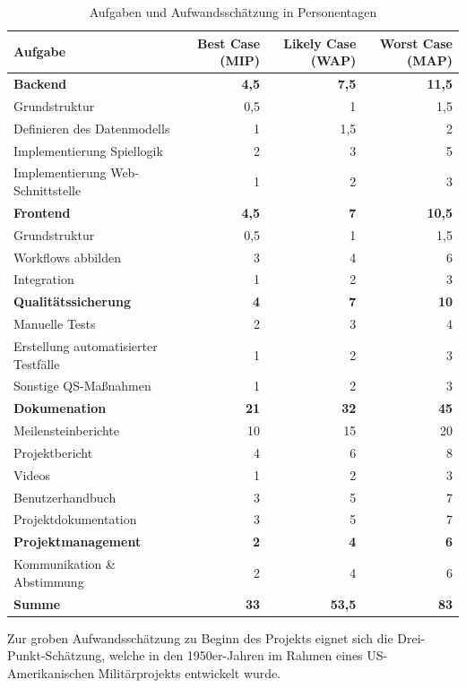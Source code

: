 \documentclass[a4paper,11pt,listof=numbered,glossary=totoc,parskip=half,toc=bib]{scrreprt}
\begin{document}
{	\begin{table}
		\centering
		\begin{tabular}{lrrr}
			\toprule
			Aufgabe & Best Case (MIP) & Likely Case (WAP) & Worst Case (MAP) \\
			\midrule
			\textbf{Backend} & \textbf{4,5} & \textbf{7,5} & \textbf{11,5} \\
			Grundstruktur & 0,5 & 1 & 1,5 \\
			Definieren des Datenmodells & 1 & 1,5 & 2 \\
			Implementierung Spiellogik & 2 & 3 & 5 \\
			Implementierung Web-Schnittstelle & 1 & 2 & 3 \\
			\midrule
			\textbf{Frontend} & \textbf{4,5} & \textbf{7} & \textbf{10,5} \\
			Grundstruktur & 0,5 & 1 & 1,5 \\
			Workflows abbilden & 3 & 4 & 6 \\
			Integration & 1 & 2 & 3 \\
			\midrule
			\textbf{Qualitätssicherung} & \textbf{4} & \textbf{7} & \textbf{10} \\
			Manuelle Tests & 2 & 3 & 4 \\
			Erstellung automatisierter Testfälle & 1 & 2 & 3 \\
			Sonstige QS-Maßnahmen & 1 & 2 & 3 \\
			\midrule 
			\textbf{Dokumenation} & \textbf{21} & \textbf{32} & \textbf{45} \\
			Meilensteinberichte & 10 & 15 & 20 \\
			Projektbericht & 4 & 6 & 8 \\
			Videos & 1 & 2 & 3 \\
			Benutzerhandbuch & 3 & 5 & 7 \\
			Projektdokumentation & 3 & 5 & 7 \\
			\midrule
			\textbf{Projektmanagement} & \textbf{2} & \textbf{4} & \textbf{6} \\
			Kommunikation \& Abstimmung & 2 & 4 & 6 \\
			\midrule 
			\Large\bfseries Summe & \Large\bfseries 33 & \Large\bfseries 53,5 & \Large\bfseries 83 \\
			\bottomrule	
				
		\end{tabular}
		\caption{Aufgaben und Aufwandsschätzung in Personentagen}
		\label{tab:aufwand}
	\end{table}
	
	Zur groben Aufwandsschätzung zu Beginn des Projekts eignet sich die Drei-Punkt-Schätzung, welche in den 1950er-Jahren im Rahmen eines US-Amerikanischen Militärprojekts entwickelt
wurde. 

}
\end{document}
